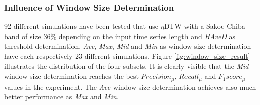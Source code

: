 \subsubsection{Influence of Window Size Determination} \label{influence_of_window_size_determination}
92 different simulations have been tested that use $\eta$DTW with a Sakoe-Chiba band of size 36\% depending on the
input time series length and \textit{HAveD} as threshold determination. \textit{Ave}, \textit{Max}, \textit{Mid} and
\textit{Min} as window size determination have each respectively 23 different simulations. Figure
\ref{fig:window_size_result} illustrates the distribution of the four subsets. It is clearly visible that the
\textit{Mid} window size determination reaches the best $Precision_{\mu}$, $Recall_{\mu}$ and $F_{1}score_{\mu}$
values in the experiment. The \textit{Ave} window size determination achieves also much better performance as
\textit{Max} and \textit{Min}.

